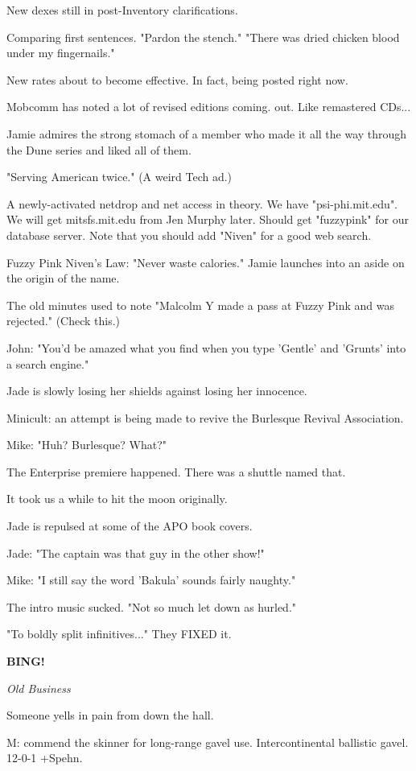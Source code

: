 \documentclass[12pt]{article}
\newcommand{\bing}{{\bf BING!} }
\newcommand{\goto}[1]{\bing \vskip 12pt \centerline{{\em{#1}}}}
\begin{document}
New dexes still in post-Inventory clarifications.

Comparing first sentences. "Pardon the stench." "There was dried chicken blood under my fingernails."

New rates about to become effective. In fact, being posted right now.

Mobcomm has noted a lot of revised editions coming. out. Like remastered CDs...

Jamie admires the strong stomach of a member who made it all the way through the Dune series and liked all of them.

"Serving American twice." (A weird Tech ad.)

A newly-activated netdrop and net access in theory. We have "psi-phi.mit.edu". We will get mitsfs.mit.edu from Jen Murphy later. Should get "fuzzypink" for our database server. Note that you should add "Niven" for a good web search.

Fuzzy Pink Niven's Law: "Never waste calories." Jamie launches into an aside on the origin of the name.

The old minutes used to note "Malcolm Y made a pass at Fuzzy Pink and was rejected." (Check this.)

John: "You'd be amazed what you find when you type 'Gentle' and 'Grunts' into a search engine."

Jade is slowly losing her shields against losing her innocence.

Minicult: an attempt is being made to revive the Burlesque Revival Association.

Mike: "Huh? Burlesque? What?"

The Enterprise premiere happened. There was a shuttle named that.

It took us a while to hit the moon originally.

Jade is repulsed at some of the APO book covers.

Jade: "The captain was that guy in the other show!"

Mike: "I still say the word 'Bakula' sounds fairly naughty."

The intro music sucked. "Not so much let down as hurled."

"To boldly split infinitives..." They FIXED it.

\goto{Old Business}

Someone yells in pain from down the hall.

M: commend the skinner for long-range gavel use. Intercontinental ballistic gavel. 12-0-1 +Spehn.
\end{document}
